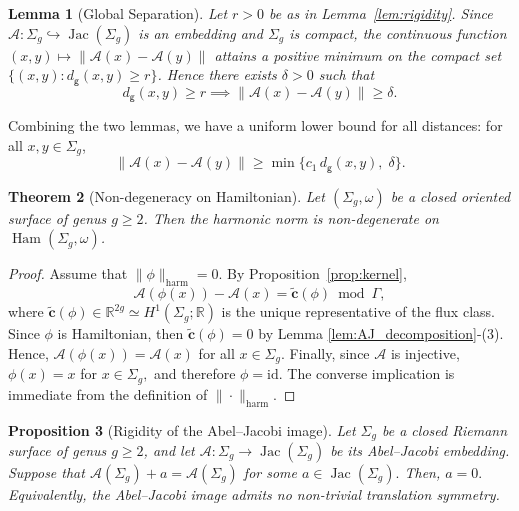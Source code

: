 \documentclass[11pt]{article}
\newtheorem{theorem}{Theorem}[section]
\newtheorem{lemma}[theorem]{Lemma}
\newtheorem{proposition}[theorem]{Proposition}
\theoremstyle{definition}
\newcommand{\Ham}{\operatorname{Ham}}
\begin{document}
	\begin{lemma}[Global Separation]
		\label{lem:global_sep}
		Let $r>0$ be as in Lemma~\ref{lem:rigidity}. Since $\mathcal A:\Sigma_g
		\hookrightarrow \operatorname{Jac}(\Sigma_g)$ is an embedding and $\Sigma_g$ is
		compact, the continuous function $(x,y)\mapsto \|\mathcal A(x)-\mathcal A(y)\|$
		attains a positive minimum on the compact set $\{(x,y): d_{\mathsf g}(x,y)\ge
		r\}$. Hence there exists $\delta>0$ such that
		\begin{equation}
			d_{\mathsf g}(x,y)\ge r \implies \|\mathcal A(x)-\mathcal A(y)\|\ge \delta.
			\label{eq:global_sep}
		\end{equation}
	\end{lemma}
	
	Combining the two lemmas, we have a uniform lower bound for all distances: for
	all $x,y\in \Sigma_g$,
	\begin{equation}\label{Lower-bound}
		\|\mathcal A(x)-\mathcal A(y)\| \ge \min\{ c_1\, d_{\mathsf g}(x,y),\;
		\delta \}.
	\end{equation}
	
	\begin{theorem}[Non-degeneracy on Hamiltonian]
		\label{thm:non_deg_ham}
		Let $(\Sigma_g,\omega)$ be a closed oriented surface of genus $g\ge2$. Then the
		harmonic norm is non-degenerate on $\Ham(\Sigma_g,\omega)$. 
	\end{theorem}
	
	\begin{proof}
		Assume that $\|\phi\|_{\mathrm{harm}} = 0.$ By Proposition~\ref{prop:kernel},
		\[
		\mathcal A(\phi(x))-\mathcal A(x)
		=
		\widetilde{\mathbf c}(\phi)\bmod\Gamma,
		\]
		where $\widetilde{\mathbf c}(\phi)\in \mathbb R^{2g} \simeq
		H^1(\Sigma_g;\mathbb R)$ is the unique representative of the flux class. Since
		$\phi$ is Hamiltonian, then $\widetilde{\mathbf c}(\phi) = 0$ by Lemma
		\ref{lem:AJ_decomposition}-(3). Hence, $\mathcal A(\phi(x)) = \mathcal A(x)$
		for all $x\in\Sigma_g.$ Finally, since $\mathcal A$ is injective,
		$\phi(x)=x$ for $x\in\Sigma_g,$ and therefore $\phi=\mathrm{id}.$ The converse
		implication is immediate from the definition of $\|\cdot\|_{\mathrm{harm}}$.
	\end{proof}
	
	\begin{proposition}[Rigidity of the Abel--Jacobi image]
		\label{prop:aj_rigidity}
		Let $\Sigma_g$ be a closed Riemann surface of genus $g\ge2$, and let $\mathcal
		A:\Sigma_g\longrightarrow \operatorname{Jac}(\Sigma_g)$ be its Abel--Jacobi
		embedding. Suppose that $\mathcal A(\Sigma_g)+a=\mathcal A(\Sigma_g)$ for some
		$a\in\operatorname{Jac}(\Sigma_g).$ Then, $a=0.$ Equivalently, the Abel--Jacobi
		image admits no non-trivial translation symmetry.
	\end{proposition}
	
\end{document}
